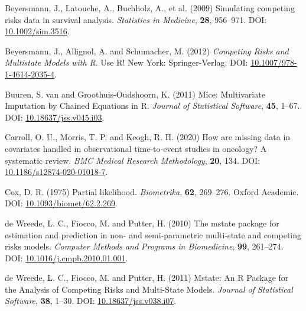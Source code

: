 \documentclass[
  letterpaper,
  DIV=11,
  numbers=noendperiod]{scrreprt}
\newlength{\cslhangindent}
\newlength{\cslentryspacingunit} %
\newenvironment{CSLReferences}[2] %
 {%
  \setlength{\parindent}{0pt}
  \ifodd #1
  \let\oldpar\par
  \def\par{\hangindent=\cslhangindent\oldpar}
  \fi
  \setlength{\parskip}{#2\cslentryspacingunit}
 }%
 {}
\begin{document}
\begin{CSLReferences}{1}{0}
\leavevmode{}%
Beyersmann, J., Latouche, A., Buchholz, A., et al. (2009) Simulating
competing risks data in survival analysis. \emph{Statistics in
Medicine}, \textbf{28}, 956--971. DOI:
\href{https://doi.org/10.1002/sim.3516}{10.1002/sim.3516}.

\leavevmode{}%
Beyersmann, J., Allignol, A. and Schumacher, M. (2012) \emph{Competing
{Risks} and {Multistate Models} with {R}}. Use {R}! New York:
Springer-Verlag. DOI:
\href{https://doi.org/10.1007/978-1-4614-2035-4}{10.1007/978-1-4614-2035-4}.

\leavevmode{}%
Buuren, S. van and Groothuis-Oudshoorn, K. (2011) Mice: {Multivariate
Imputation} by {Chained Equations} in {R}. \emph{Journal of Statistical
Software}, \textbf{45}, 1--67. DOI:
\href{https://doi.org/10.18637/jss.v045.i03}{10.18637/jss.v045.i03}.

\leavevmode{}%
Carroll, O. U., Morris, T. P. and Keogh, R. H. (2020) How are missing
data in covariates handled in observational time-to-event studies in
oncology? {A} systematic review. \emph{BMC Medical Research
Methodology}, \textbf{20}, 134. DOI:
\href{https://doi.org/10.1186/s12874-020-01018-7}{10.1186/s12874-020-01018-7}.

\leavevmode{}%
Cox, D. R. (1975) Partial likelihood. \emph{Biometrika}, \textbf{62},
269--276. Oxford Academic. DOI:
\href{https://doi.org/10.1093/biomet/62.2.269}{10.1093/biomet/62.2.269}.

\leavevmode{}%
de Wreede, L. C., Fiocco, M. and Putter, H. (2010) The mstate package
for estimation and prediction in non- and semi-parametric multi-state
and competing risks models. \emph{Computer Methods and Programs in
Biomedicine}, \textbf{99}, 261--274. DOI:
\href{https://doi.org/10.1016/j.cmpb.2010.01.001}{10.1016/j.cmpb.2010.01.001}.

\leavevmode{}%
de Wreede, L. C., Fiocco, M. and Putter, H. (2011) Mstate: {An R
Package} for the {Analysis} of {Competing Risks} and {Multi-State
Models}. \emph{Journal of Statistical Software}, \textbf{38}, 1--30.
DOI:
\href{https://doi.org/10.18637/jss.v038.i07}{10.18637/jss.v038.i07}.


\end{CSLReferences}
\end{document}
